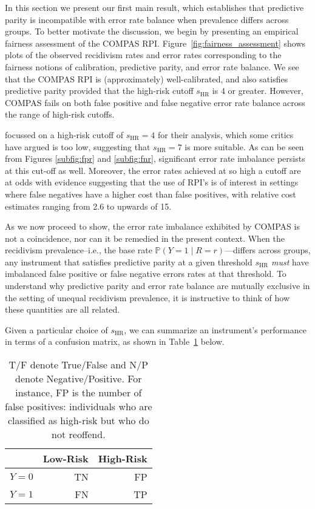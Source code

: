 \documentclass[11pt, svgnames]{article}
\renewcommand{\P}{\mathbb{P}}
\numberwithin{equation}{section}
\theoremstyle{plain}
\theoremstyle{definition}
\numberwithin{prop}{section}
\numberwithin{corollary}{section}
\begin{document}
In this section we present our first main result, which establishes that predictive parity is incompatible with error rate balance when prevalence differs across groups.  To better motivate the discussion, we begin by presenting an empirical fairness assessment of the COMPAS RPI.  Figure~\ref{fig:fairness_assessment} shows plots of the observed recidivism rates and error rates corresponding to the fairness notions of calibration, predictive parity, and error rate balance.   We see that the COMPAS RPI is (approximately) well-calibrated, and also satisfies predictive parity provided that the high-risk cutoff $s_\mathrm{HR}$ is $4$ or greater. However, COMPAS fails on both false positive and false negative error rate balance across the range of high-risk cutoffs. 
 
\citet{propublica2016} focussed on a high-risk cutoff of $s_\mathrm{HR} = 4$ for their analysis, which some critics have argued is too low, suggesting that $s_\mathrm{HR} = 7$ is more suitable.  As can be seen from Figures  \ref{subfig:fpr} and \ref{subfig:fnr}, significant error rate imbalance persists at this cut-off as well.   Moreover, the error rates achieved at so high a cutoff are at odds with evidence suggesting that the use of RPI's is of interest in settings where false negatives have a higher cost than false positives, with relative cost estimates ranging from 2.6  to upwards of 15. \citep{nij2013, psc2013}
 
 As we now proceed to show, the error rate imbalance exhibited by COMPAS is not a coincidence, nor can it be remedied in the present context.  When the recidivism prevalence--i.e., the base rate $\P(Y = 1 \mid R = r)$---differs across groups, any instrument that satisfies predictive parity at a given threshold $s_\mathrm{HR}$ \emph{must} have imbalanced false positive or false negative errors rates at that threshold.  To understand why predictive parity and error rate balance are mutually exclusive in the setting of unequal recidivism prevalence, it is instructive to think of how these quantities are all related.  
 
 Given a particular choice of $s_\mathrm{HR}$, we can summarize an instrument's performance in terms of a confusion matrix, as shown in Table~\ref{tab:confusion} below.
 \begin{table}[h]
   \centering 
      \begin{tabular}{|r|rr|}
        \hline
       & Low-Risk & High-Risk \\ 
        \hline
      $Y = 0$ & TN & FP \\ 
        $Y = 1$ & FN & TP \\ 
         \hline
      \end{tabular} \\
      \vspace{0.5em}
      \caption{T/F denote True/False and N/P denote Negative/Positive. For instance, FP is the number of false positives: individuals who are classified as high-risk but who do not reoffend.}
      \label{tab:confusion}
 \end{table}
\end{document}
